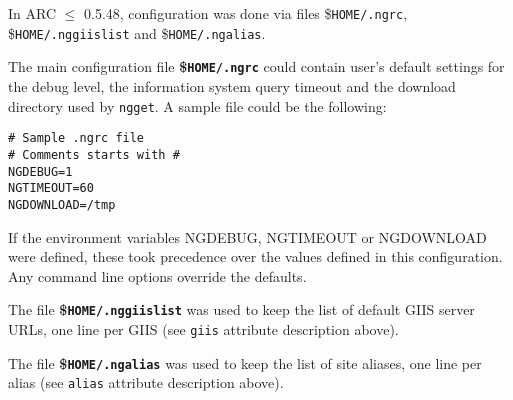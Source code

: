 In ARC $\leq$ 0.5.48, configuration was done via files {\$}\texttt{HOME/.ngrc},
{\$}\texttt{HOME/.nggiislist} and {\$}\texttt{HOME/.ngalias}.

The main configuration file \textbf{{\$}\texttt{HOME/.ngrc}} could contain
user's default settings for the debug level, the information system
query timeout and the download directory used by \texttt{ngget}. A
sample file could be the following:
\begin{verbatim}
# Sample .ngrc file
# Comments starts with #
NGDEBUG=1
NGTIMEOUT=60
NGDOWNLOAD=/tmp
\end{verbatim}

If the environment variables NGDEBUG, NGTIMEOUT or NGDOWNLOAD were
defined, these took precedence over the values defined in this
configuration. Any command line options override the defaults.

The file \textbf{{\$}\texttt{HOME/.nggiislist}} was used to keep the
list of default GIIS server URLs, one line per GIIS (see \texttt{giis}
attribute description above). 

The file \textbf{{\$}\texttt{HOME/.ngalias}} was used to keep the
list of site aliases, one line per alias (see \texttt{alias}
attribute description above). 
